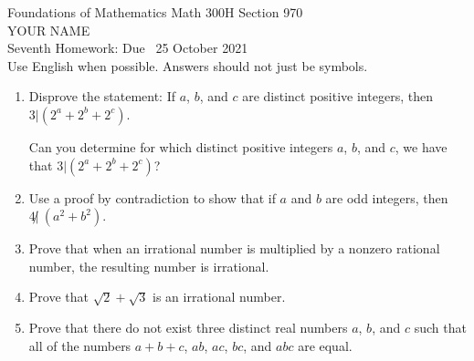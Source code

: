 \documentclass[12pt]{article}
\begin{document}
\LARGE 
\noindent
{\color{Maroon}Foundations of Mathematics \hfill Math 300H Section 970}\vspace{2pt}\\
\Large YOUR NAME\vspace{2pt}\\
\large
Seventh Homework: \hfill Due \  25 October 2021\\
Use English when possible.  Answers should not just be symbols.
\normalsize\medskip


\noindent{\color{blue}\rule{500pt}{2pt}}\medskip


\begin{enumerate}  %



\item Disprove the statement:  If $a$, $b$, and $c$ are distinct positive integers, then $3|(2^a+2^b+2^c)$.

  Can you determine for which distinct positive integers $a$, $b$, and $c$, we have that  $3|(2^a+2^b+2^c)$?

\item Use a proof by contradiction to show that if $a$ and $b$ are odd integers, then $4 \not|\ (a^2+b^2)$.

\item Prove that when an irrational number is multiplied by a nonzero rational number, the resulting number is irrational.

\item Prove that $\sqrt{2}+\sqrt{3}$ is an irrational number.

\item Prove that there do not exist three distinct real numbers $a$, $b$, and $c$ such that all of the numbers $a+b+c$,
  $ab$, $ac$, $bc$, and $abc$ are equal.


\end{enumerate}
\end{document}
